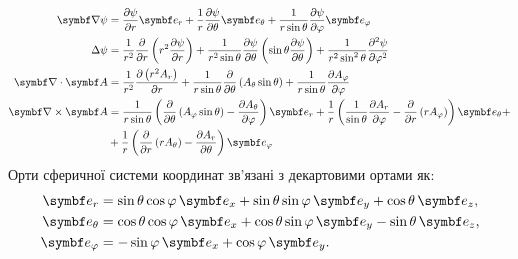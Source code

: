 \begin{align}\label{spheric}
    \vect{\nabla}\psi & = \frac{\partial \psi}{\partial r} \vect{e}_{r} + \frac{1}{r}\frac{\partial \psi}{\partial \theta} \vect{e}_{\theta} + \frac{1}{r\sin\theta}\frac{\partial \psi}{\partial \phi} \vect{e}_{\phi}                                                                                                            \\
	\Laplasian\psi    & = \frac{1}{r^2} \frac{\partial}{\partial r} \left( r^2 \frac{\partial \psi}{\partial r} \right) + \frac{1}{r^2 \sin \theta} \frac{\partial \psi}{\partial \theta} \left( \sin \theta \frac{\partial \psi}{\partial \theta} \right) + \frac{1}{r^2\sin^2 \theta} \frac{\partial^2 \psi}{\partial \phi^2} \\
	\divg\vect{A}     & =\frac{1}{r^2}\frac{\partial \left(r^2A_r\right)}{\partial r}
	+
	\frac{1}{r\sin \theta }\frac{\partial}{\partial \theta }\left(A_{\theta }\sin \theta \right)
	+
	\frac{1}{r\sin\theta}\frac{\partial A_{\phi}}{\partial \phi }                                                                                                                                                                                                                                                            \\
	\rot\vect{A}      & = \frac{1}{r\sin \theta }\left(\frac{\partial}{\partial \theta }\left(A_{\phi }\sin \theta \right)-\frac{\partial A_{\theta }}{\partial \phi }\right)\vect{e}_{r}
	+
	\frac{1}{r}\left(\frac{1}{\sin \theta }\frac{\partial A_{r}}{\partial \phi }-\frac{\partial}{\partial r}\left(rA_{\phi }\right)\right)\vect{e}_{\theta}
	+ \nonumber                                                                                                                                                                                                                                                                                                                    \\
	                  & + \frac{1}{r}\left(\frac{\partial}{\partial r}\left(rA_{\theta }\right)-\frac{\partial A_{r}}{\partial \theta }\right)\vect{e}_{\phi}
\end{align}
Орти сферичної системи координат зв'язані з декартовими ортами як:
\begin{align}\label{}
    \vect{e}_r &= \sin\theta\cos\phi\, \vect{e}_x + \sin\theta\sin\phi\, \vect{e}_y + \cos\theta\, \vect{e}_z, \\
    \vect{e}_{\theta} &= \cos\theta\cos\phi\, \vect{e}_x + \cos\theta\sin\phi\, \vect{e}_y - \sin\theta\, \vect{e}_z, \\
    \vect{e}_{\phi} &= -\sin\phi\, \vect{e}_x + \cos\phi\, \vect{e}_y. \\
\end{align}

